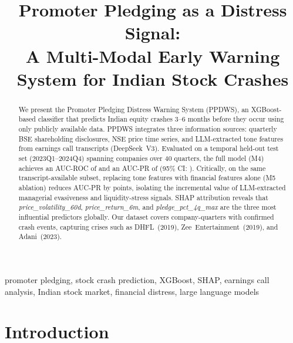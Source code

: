 \documentclass[conference]{IEEEtran}
\begin{document}
\title{Promoter Pledging as a Distress Signal:\\
A Multi-Modal Early Warning System for Indian Stock Crashes}

\author{
}

\maketitle

\begin{abstract}
We present the Promoter Pledging Distress Warning System (PPDWS), an
XGBoost-based classifier that predicts Indian equity crashes 3--6 months
before they occur using only publicly available data. PPDWS integrates
three information sources: quarterly BSE shareholding disclosures,
NSE price time series, and LLM-extracted tone features from
earnings call transcripts (DeepSeek~V3). Evaluated on a
temporal held-out test set (2023Q1--2024Q4) spanning
 companies over 40 quarters, the full model (M4)
achieves an AUC-ROC of  and an AUC-PR of
 (95\% CI: ).
Critically, on the same transcript-available subset, replacing tone features
with financial features alone (M5 ablation) reduces AUC-PR by
 points, isolating the incremental value of
LLM-extracted managerial evasiveness and liquidity-stress signals.
SHAP attribution reveals that \textit{price\_volatility\_60d},
\textit{price\_return\_6m}, and \textit{pledge\_pct\_4q\_max}
are the three most influential predictors globally. Our dataset covers
 company-quarters with
 confirmed crash events, capturing crises such as
DHFL~(2019), Zee~Entertainment~(2019), and Adani~(2023).
\end{abstract}

\begin{IEEEkeywords}
promoter pledging, stock crash prediction, XGBoost, SHAP, earnings call analysis,
Indian stock market, financial distress, large language models
\end{IEEEkeywords}

\section{Introduction}
\end{document}
